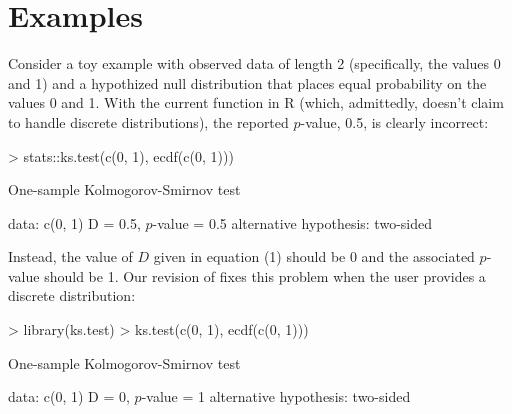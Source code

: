  
\section{Examples}

Consider a toy example with observed data of length 2 (specifically, the
values 0 and 1) and a hypothized null distribution that places equal
probability on the values 0 and 1.  With the current  function
in R (which, admittedly, doesn't claim to handle discrete distributions),
the reported $p$-value, 0.5, is clearly incorrect:
\begin{Schunk}
\begin{Sinput}
> stats::ks.test(c(0, 1), ecdf(c(0, 1)))
\end{Sinput}
\begin{Soutput}
	One-sample Kolmogorov-Smirnov test

data:  c(0, 1) 
D = 0.5, $p$-value = 0.5
alternative hypothesis: two-sided 
\end{Soutput}
\end{Schunk}
Instead, the value of $D$ given in equation (1)
should be 0 and the associated $p$-value should be 1.  Our revision of 
fixes this problem when the user provides a discrete distribution:
\begin{Schunk} 
\begin{Sinput}
> library(ks.test)
> ks.test(c(0, 1), ecdf(c(0, 1)))
\end{Sinput}
\begin{Soutput}
	One-sample Kolmogorov-Smirnov test

data:  c(0, 1) 
D = 0, $p$-value = 1
alternative hypothesis: two-sided 
\end{Soutput}
\end{Schunk}

